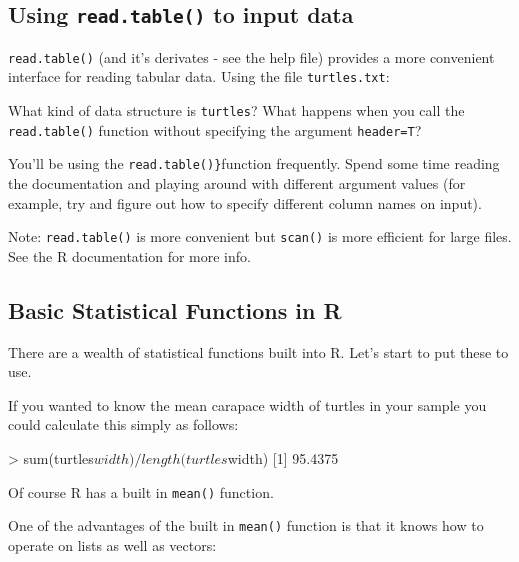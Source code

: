 \subsection{Using \lstinline!read.table()! to input data}

\lstinline!read.table()! (and it's derivates - see the help file)
provides a more convenient interface for reading tabular data. Using the
file \lstinline!turtles.txt!:

What kind of data structure is \lstinline!turtles!? What happens when
you call the \lstinline!read.table()! function without specifying the
argument \lstinline!header=T!?

You'll be using the \lstinline!read.table()}!function frequently. Spend
some time reading the documentation and playing around with different
argument values (for example, try and figure out how to specify
different column names on input).

Note: \lstinline!read.table()! is more convenient but \lstinline!scan()!
is more efficient for large files. See the R documentation for more
info.

\subsection{Basic Statistical Functions in R}

There are a wealth of statistical functions built into R. Let's start to
put these to use.

If you wanted to know the mean carapace width of turtles in your sample
you could calculate this simply as follows:

\begin{R}
> sum(turtles$width)/length(turtles$width)
[1] 95.4375
\end{R}
Of course R has a built in \lstinline!mean()! function.

One of the advantages of the built in \lstinline!mean()! function is
that it knows how to operate on lists as well as vectors:

